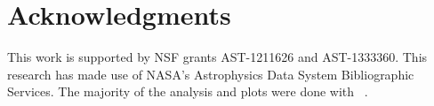 \documentclass[useAMS,usenatbib]{mn2e}
\begin{document}
\section*{Acknowledgments}

This work is supported by NSF grants AST-1211626 and AST-1333360.
This research has made use of NASA's Astrophysics Data System
Bibliographic Services.  The majority of the analysis and plots were
done with \yt~\citep{yt_full_paper}.


\bsp
\label{lastpage}
\end{document}
